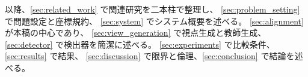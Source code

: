 以降、\cref{sec:related_work} で関連研究を二本柱で整理し、
\cref{sec:problem_setting} で問題設定と座標規約、
\cref{sec:system} でシステム概要を述べる。
\cref{sec:alignment} が本稿の中心であり、
\cref{sec:view_generation} で視点生成と教師生成、
\cref{sec:detector} で検出器を簡潔に述べる。
\cref{sec:experiments} で比較条件、\cref{sec:results} で結果、
\cref{sec:discussion} で限界と倫理、\cref{sec:conclusion} で結論を述べる。
